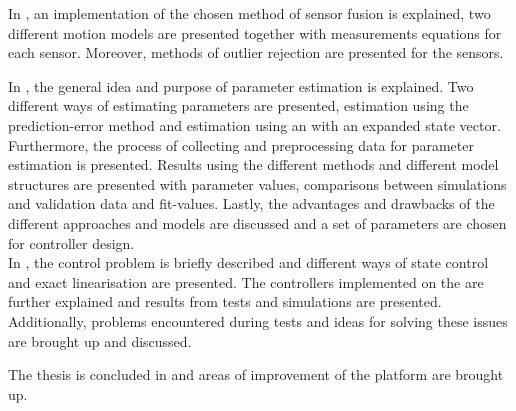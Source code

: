 In , an implementation of the chosen method of sensor fusion is explained, two different motion models are presented together with measurements equations for each \abbrROV sensor. Moreover, methods of outlier rejection are presented for the sensors.

In , the general idea and purpose of parameter estimation is explained. Two different ways of estimating parameters are presented, estimation using the prediction-error method and estimation using an \abbrEKF with an expanded state vector. Furthermore, the process of collecting and preprocessing data for parameter estimation is presented. Results using the different methods and different model structures are presented with parameter values, comparisons between simulations and validation data and fit-values. Lastly, the advantages and drawbacks of the different approaches and models are discussed and a set of parameters are chosen for controller design.\\

In , the control problem is briefly described and different ways of state control and exact linearisation are presented. The controllers implemented on the \abbrROV are further explained and results from tests and simulations are presented. Additionally, problems encountered during tests and ideas for solving these issues are brought up and discussed.

The thesis is concluded in  and areas of improvement of the \abbrROV platform are brought up. 
